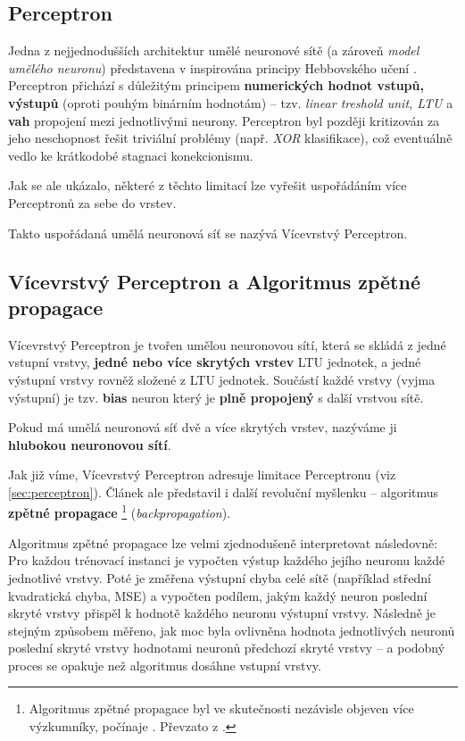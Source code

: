 \subsection{Perceptron}
\label{sec:perceptron}
Jedna z nejjednodušších architektur umělé neuronové sítě (a zároveň \emph{model umělého neuronu}) představena v \cite{Rosenblatt1957} inspirována principy Hebbovského učení \cite{Hebb1949}.
Perceptron přichází s důležitým principem \textbf{numerických hodnot vstupů, výstupů} (oproti pouhým binárním hodnotám) – tzv. \emph{linear treshold unit, LTU} a \textbf{vah} propojení mezi jednotlivými neurony. 
Perceptron byl později kritizován \cite{Minsky1969} za jeho neschopnost řešit triviální problémy (např. \emph{XOR} klasifikace), což eventuálně vedlo ke krátkodobé stagnaci konekcionismu.

Jak se ale ukázalo, některé z těchto limitací lze vyřešit uspořádáním více Perceptronů za sebe do vrstev. \cite{Rumelhart1987}

Takto uspořádaná umělá neuronová síť se nazývá Vícevrstvý Perceptron.

\subsection{Vícevrstvý Perceptron a Algoritmus zpětné propagace}
\label{sec:multilayer_perceptron}
Vícevrstvý Perceptron je tvořen umělou neuronovou sítí, která se skládá z jedné vstupní vrstvy, \textbf{jedné nebo více skrytých vrstev} LTU jednotek, a jedné výstupní vrstvy rovněž složené z LTU jednotek.
Součástí každé vrstvy (vyjma výstupní) je tzv. \textbf{bias} neuron který je \textbf{plně propojený} s další vrstvou sítě. \cite{Geron2019}

Pokud má umělá neuronová síť dvě a více skrytých vrstev, nazýváme ji \textbf{hlubokou neuronovou sítí}.

Jak již víme, Vícevrstvý Perceptron adresuje limitace Perceptronu (viz \autoref{sec:perceptron}).
Článek \cite{Rumelhart1987} ale představil i další revoluční myšlenku – algoritmus \textbf{zpětné propagace}
\footnote{Algoritmus zpětné propagace byl ve skutečnosti nezávisle objeven více výzkumníky, počínaje \cite{Werbos1974}. Převzato z \cite{Geron2019}.} (\emph{backpropagation}).

Algoritmus zpětné propagace lze velmi zjednodušeně interpretovat následovně: Pro každou trénovací instanci je vypočten výstup každého jejího neuronu každé jednotlivé vrstvy.
Poté je změřena výstupní chyba celé sítě (například střední kvadratická chyba, MSE) a vypočten podílem, jakým každý neuron poslední skryté vrstvy přispěl k hodnotě každého neuronu výstupní vrstvy.
Následně je stejným způsobem měřeno, jak moc byla ovlivněna hodnota jednotlivých neuronů poslední skryté vrstvy hodnotami neuronů předchozí skryté vrstvy – a podobný proces se opakuje než algoritmus dosáhne vstupní vrstvy. \cite{Geron2019}

